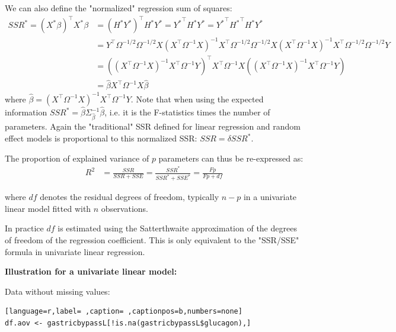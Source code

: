 \documentclass[12pt]{article}
\newcommand\Warning[1][3ex]{%
\renewcommand\stacktype{L}%
\scaleto{\stackon[1.3pt]{\color{red}$\triangle$}{\tiny\bfseries !}}{#1}%
\xspace
}
\newcommand\trans[1]{{#1}^\intercal}%
\begin{document}
\bigskip

We can also define the "normalized" regression sum of squares:
\begin{align*}
SSR^* = \trans{(X^*\beta)}X^*\beta &= \trans{\left(H^* Y^*\right)} H^* Y^* = \trans{Y^*} H^* Y^* = \trans{Y^*} \trans{H^*} H^* Y^* \\
&= \trans{Y} \Omega^{-1/2} \Omega^{-1/2} X (\trans{X}\Omega^{-1}X)^{-1} \trans{X} \Omega^{-1/2} \Omega^{-1/2} X (\trans{X}\Omega^{-1}X)^{-1} \trans{X} \Omega^{-1/2} \Omega^{-1/2} Y \\
&= \trans{\left((\trans{X}\Omega^{-1}X)^{-1} \trans{X} \Omega^{-1} Y\right)} \trans{X} \Omega^{-1} X \left((\trans{X}\Omega^{-1}X)^{-1} \trans{X} \Omega^{-1} Y\right) \\
&= \widehat{\beta} \trans{X} \Omega^{-1} X \widehat{\beta}
\end{align*}
where \(\widehat{\beta}= \left(\trans{X}\Omega^{-1}
X\right)^{-1}\trans{X} \Omega^{-1} Y\). Note that when using the
expected information \(SSR^* = \widehat{\beta}
\Sigma^{-1}_{\widehat{\beta}} \widehat{\beta}\), i.e. it is the
F-statistics times the number of parameters. Again the "traditional"
SSR defined for linear regression and random effect models is
proportional to this normalized SSR: \(SSR=\delta SSR^{*}\).

\bigskip

The proportion of explained variance of \(p\) parameters can thus be
re-expressed as:
\begin{align*}
R^2 &= \frac{SSR}{SSR+SSE} = \frac{SSR^*}{SSR^*+SSE^*}= \frac{Fp}{Fp+df}
\end{align*}

where \(df\) denotes the residual degrees of freedom, typically
\(n-p\) in a univariate linear model fitted with \(n\)
observations. \newline \Warning In practice \(df\) is estimated using the
Satterthwaite approximation of the degrees of freedom of the
regression coefficient. This is only equivalent to the "SSR/SSE"
formula in univariate linear regression.

\bigskip
\bigskip

\textbf{Illustration for a univariate linear model:}

\bigskip

Data without missing values:
\begin{lstlisting}[language=r,label= ,caption= ,captionpos=b,numbers=none]
df.aov <- gastricbypassL[!is.na(gastricbypassL$glucagon),]
\end{lstlisting}
\end{document}
